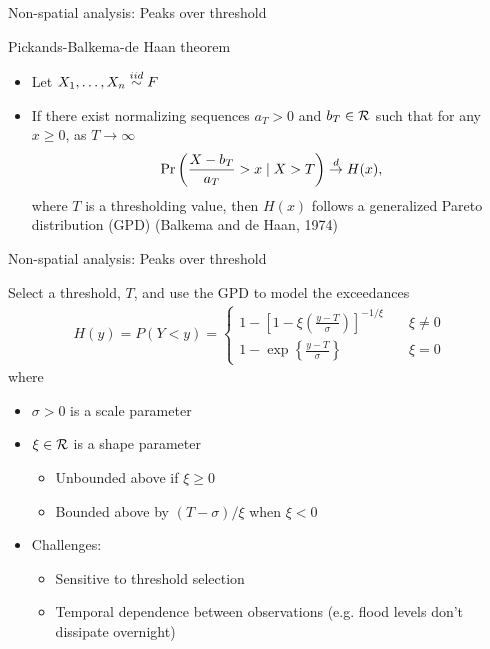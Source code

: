 \documentclass{beamer}
\begin{document}
\begin{frame}{Non-spatial analysis: Peaks over threshold}
\begin{adjustwidth}{1em}{0em}
  Pickands-Balkema-de Haan theorem \vspace{1em}
  \begin{itemize} \setlength{\itemsep}{1em}
    \item Let $X_1, \ldots, X_n \stackrel{iid}{\sim} F$
    \item If there exist normalizing sequences $a_T > 0$ and $b_T \in {\cal R}$ such that for any $x \ge 0$, as $T \rightarrow \infty$
    \begin{align*}
      \Pr\left(\frac{X - b_T}{a_T} > x \mid X > T\right) \stackrel{d}{\rightarrow} H(x),
    \end{align*}
    where $T$ is a thresholding value, then $H(x)$ follows a generalized Pareto distribution (GPD) (Balkema and de Haan, 1974)
  \end{itemize}
\end{adjustwidth}
\end{frame}

\begin{frame}{Non-spatial analysis: Peaks over threshold}
\begin{adjustwidth}{1em}{0em}
  Select a threshold, $T$, and use the GPD to model the exceedances
  \begin{align*}
    H(y) = P(Y < y) = \left\{ \begin{array}{ll}
      1 - \left[1 - \xi \left( \frac{ y - T }{ \sigma } \right) \right]^{-1 / \xi} & \quad \xi \neq 0 \\[0.5em]
      1 - \exp \left\{ \frac{ y - T }{ \sigma} \right\} & \quad \xi = 0
    \end{array}\right.
  \end{align*}
  where
  \begin{itemize} \setlength{\itemsep}{0.25em}
    \item $\sigma > 0$ is a scale parameter
    \item $\xi \in {\cal R}$ is a shape parameter
    \begin{itemize}
      \item Unbounded above if $\xi \ge 0$
      \item Bounded above by $(T - \sigma) / \xi$ when $\xi < 0$
    \end{itemize}
    \item Challenges: \vspace{0.5em}
    \begin{itemize} \setlength{\itemsep}{0.5em}
      \item Sensitive to threshold selection
      \item Temporal dependence between observations (e.g. flood levels don't dissipate overnight)
    \end{itemize}
  \end{itemize}
\end{adjustwidth}
\end{frame}
\end{document}
